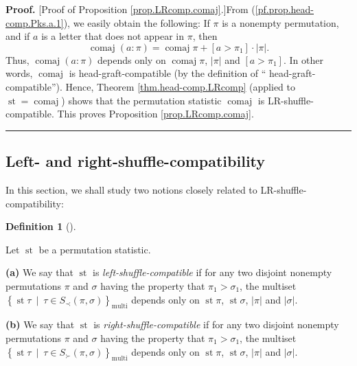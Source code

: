 \documentclass[numbers=enddot,12pt,final,onecolumn,notitlepage]{scrartcl}%
\theoremstyle{definition}
\newtheorem{defi}[theo]{Definition}
\newenvironment{definition}[1][]
{\begin{defi}[#1]\begin{leftbar}}
{\end{leftbar}\end{defi}}
\newenvironment{proof}[1][Proof]{\noindent\textbf{#1.} }{\ \rule{0.5em}{0.5em}}
\begin{document}
\begin{proof}
[Proof of Proposition \ref{prop.LRcomp.comaj}.]From
(\ref{pf.prop.head-comp.Pks.a.1}), we easily obtain the following: If $\pi$ is
a nonempty permutation, and if $a$ is a letter that does not appear in $\pi$,
then%
\[
\operatorname*{comaj}\left(  a:\pi\right)  =\operatorname*{comaj}\pi+\left[
a>\pi_{1}\right]  \cdot\left\vert \pi\right\vert .
\]
Thus, $\operatorname*{comaj}\left(  a:\pi\right)  $ depends only on
$\operatorname*{comaj}\pi$, $\left\vert \pi\right\vert $ and $\left[
a>\pi_{1}\right]  $. In other words, $\operatorname*{comaj}$ is
head-graft-compatible (by the definition of \textquotedblleft
head-graft-compatible\textquotedblright). Hence, Theorem
\ref{thm.head-comp.LRcomp} (applied to $\operatorname{st}
=\operatorname*{comaj}$) shows that the permutation statistic
$\operatorname*{comaj}$ is LR-shuffle-compatible. This proves Proposition
\ref{prop.LRcomp.comaj}.
\end{proof}

\subsection{Left- and right-shuffle-compatibility}

In this section, we shall study two notions closely related to LR-shuffle-compatibility:

\begin{definition}
\label{def.LR.left-right}Let $\operatorname{st}$ be a permutation statistic.

\textbf{(a)} We say that $\operatorname{st}$ is
\textit{left-shuffle-compatible} if for any two disjoint nonempty permutations
$\pi$ and $\sigma$ having the property that $\pi_{1}>\sigma_{1}$, the multiset
$\left\{  \operatorname{st} \tau   \ \mid\ \tau\in S_{\prec
}\left(  \pi,\sigma\right)  \right\}  _{\operatorname*{multi}}$ depends only
on $\operatorname{st} \pi$, $\operatorname{st} \sigma$,
$\left\vert \pi\right\vert $ and $\left\vert \sigma \right\vert $.

\textbf{(b)} We say that $\operatorname{st}$ is
\textit{right-shuffle-compatible} if for any two disjoint nonempty
permutations $\pi$ and $\sigma$ having the property that $\pi_{1}>\sigma_{1}$,
the multiset $\left\{  \operatorname{st} \tau   \ \mid\ \tau\in
S_{\succ}\left(  \pi,\sigma\right)  \right\}  _{\operatorname*{multi}}$
depends only on $\operatorname{st} \pi$, $\operatorname{st} \sigma$,
$\left\vert \pi\right\vert $ and $\left\vert \sigma\right\vert $.
\end{definition}
\end{document}
